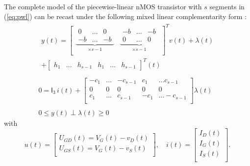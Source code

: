 The complete model of the piecewise-linear nMOS transistor with $s$ segments in (\ref{eq:pwl}) can be recast under the following mixed linear complementarity form \cite{leenaerts-bokhoven1998}:
\begin{equation}
  \label{eq:68}
  \begin{array}{l}
    \begin{split}
      y(t) = \left[\begin{array}{cc} \underbrace{ \begin{array}{ccc}
              0 & \ldots & 0 \\
              -b & \ldots & -b
            \end{array}}_{\times s-1}
          &\underbrace{ \begin{array}{ccc}-b &\ldots & -b \\ 0 &\ldots & 0\end{array}}_{\times s-1} \\
        \end{array}\right]^T
      v(t) + \lambda(t) \\ + \left[\begin{array}{cccccc} h_1 &\ldots &
          h_{s-1} & h_1 &\ldots & h_{s-1}
        \end{array}
      \right]^T (t)
    \end{split}
\\ \\ 
 0 =
  \mathsf I_3\,
 i(t) 
 + 
 \left[\begin{array}{cccccc}
   -c_1  &\ldots & -c_{s-1} & c_1 &\ldots c_{s-1} \\
   0  & 0& 0 &0  & 0  \\
   c_{1}  &\ldots & c_{s-1} & -c_1 &\ldots -c_{s-1} \\
 \end{array}\right]
\lambda(t) \\ \\ 0 \leq y(t) \perp \lambda(t) \geq 0
\end{array}
\end{equation}
  with
\begin{equation}
  \label{eq:69}
  u(t) = 
  \left[\begin{array}{c}
    U_{GD}(t)=V_G(t)-v_D(t) \\
    U_{GS}(t)=V_G(t)-v_S(t) \\ 
  \end{array}\right],\quad
i(t) = 
  \left[\begin{array}{c}
   I_D(t) \\
   I_G(t) \\
   I_S(t) \\
  \end{array}\right].
\end{equation}
